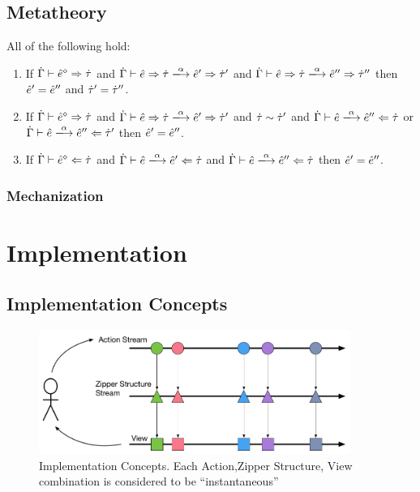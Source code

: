 \documentclass{llncs}
\begin{document}
\subsection{Metatheory}\label{sec:mt}

\begin{theorem} All of the following hold:
\label{thrm:actdet}
\begin{enumerate}
\item If $\dot{\Gamma} \vdash \hat{e}^{\diamond} \Rightarrow \dot{\tau}$ and $\performSyn{\hGamma}{\zexp}{\htau}{\alpha}{\zexp'}{\htau'}$ and $\performSyn{\hGamma}{\zexp}{\htau}{\alpha}{\zexp''}{\htau''}$ then $\hat{e}' = \hat{e}''$ and $\dot{\tau}' = \dot{\tau}''$.
\item If $\dot{\Gamma} \vdash \hat{e}^{\diamond} \Rightarrow \dot{\tau}$ and $\performSyn{\hGamma}{\zexp}{\htau}{\alpha}{\zexp'}{\htau'}$ and $\dot{\tau} \sim \dot{\tau}'$ and $\performAna{\hGamma}{\zexp}{\htau}{\alpha}{\zexp''}$ or $\performAna{\hGamma}{\zexp}{\htau'}{\alpha}{\zexp''}$ then $\hat{e}' = \hat{e}''$.
\item If $\dot{\Gamma} \vdash \hat{e}^{\diamond} \Leftarrow \dot{\tau}$ and $\performAna{\hGamma}{\zexp}{\htau}{\alpha}{\zexp'}$ and $\performAna{\hGamma}{\zexp}{\htau}{\alpha}{\zexp''}$ then $\hat{e}' = \hat{e}''$.
\end{enumerate}
\end{theorem}


\subsubsection{Mechanization}
\label{sec:mech}


\section{Implementation}
\label{sec:impl}

\subsection{Implementation Concepts}

\begin{figure}
\centering
\includegraphics[width=4in]{Implementation_Diagram}
\caption{Implementation Concepts. Each Action,Zipper Structure, View combination is considered to be ``instantaneous''}
\label{fig:FRP}
\end{figure}
\end{document}
